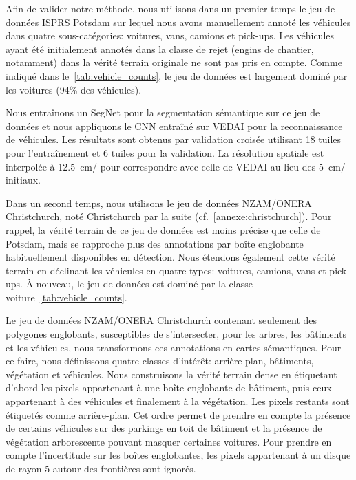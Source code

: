 Afin de valider notre méthode, nous utilisons dans un premier temps le jeu de données \gls{ISPRS} Potsdam sur lequel nous avons manuellement annoté les véhicules dans quatre sous-catégories: voitures, vans, camions et pick-ups. Les véhicules ayant été initialement annotés dans la classe de rejet (engins de chantier, notamment) dans la vérité terrain originale ne sont pas pris en compte. Comme indiqué dans le~\cref{tab:vehicle_counts}, le jeu de données est largement dominé par les voitures (94\% des véhicules).

Nous entraînons un SegNet pour la segmentation sémantique sur ce jeu de données et nous appliquons le \gls{CNN} entraîné sur \gls{VEDAI} pour la reconnaissance de véhicules. Les résultats sont obtenus par validation croisée utilisant 18 tuiles pour l'entraînement et 6 tuiles pour la validation. La résolution spatiale est interpolée à \SI{12,5}{\centi\meter/\px} pour correspondre avec celle de \gls{VEDAI} au lieu des \SI{5}{\centi\meter/\px} initiaux.

Dans un second temps, nous utilisons le jeu de données NZAM/ONERA Christchurch, noté Christchurch par la suite (cf.~\cref{annexe:christchurch}). Pour rappel, la vérité terrain de ce jeu de données est moins précise que celle de Potsdam, mais se rapproche plus des annotations par boîte englobante habituellement disponibles en détection. Nous étendons également cette vérité terrain en déclinant les véhicules en quatre types: voitures, camions, vans et pick-ups. À nouveau, le jeu de données est dominé par la classe voiture~\cref{tab:vehicle_counts}.

Le jeu de données NZAM/ONERA Christchurch contenant seulement des polygones englobants, susceptibles de s'intersecter, pour les arbres, les bâtiments et les véhicules, nous transformons ces annotations en cartes sémantiques. Pour ce faire, nous définissons quatre classes d'intérêt: arrière-plan, bâtiments, végétation et véhicules. Nous construisons la vérité terrain dense en étiquetant d'abord les pixels appartenant à une boîte englobante de bâtiment, puis ceux appartenant à des véhicules et finalement à la végétation. Les pixels restants sont étiquetés comme arrière-plan. Cet ordre permet de prendre en compte la présence de certains véhicules sur des parkings en toit de bâtiment et la présence de végétation arborescente pouvant masquer certaines voitures. Pour prendre en compte l'incertitude sur les boîtes englobantes, les pixels appartenant à un disque de rayon \SI{5}{\px} autour des frontières sont ignorés.

